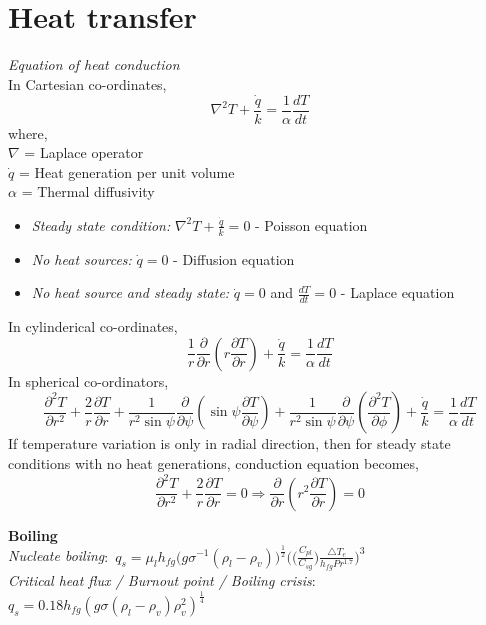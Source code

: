 \documentclass[12pt,a4paper]{article}
\begin{document}
\section*{Heat transfer}

\textit{Equation of heat conduction}\vspace{3mm}\\
In Cartesian co-ordinates,
$$\nabla ^{2}T+\frac{\dot{q}}{k}=\frac{1}{\alpha}\frac{dT}{dt}$$
where,\\
$\nabla$ = Laplace operator\\
$\dot{q}$ = Heat generation per unit volume\\
$\alpha$ = Thermal diffusivity\\
\begin{itemize}
    \item \textit{Steady state condition:} $\nabla ^{2}T+\frac{\dot{q}}{k}=0$ - Poisson equation
    \item \textit{No heat sources:} $\dot{q}=0$ - Diffusion equation
    \item \textit{No heat source and steady state:} $\dot{q}=0$ and $\frac{dT}{dt}=0$ - Laplace equation
\end{itemize}
In cylinderical co-ordinates,
$$ \frac{1}{r}\frac{\partial}{\partial r}\left( r \frac{\partial T}{\partial r} \right)+\frac{\dot{q}}{k}=\frac{1}{\alpha}\frac{dT}{dt}$$
In spherical co-ordinators,
$$\frac{\partial^2T}{\partial r^2}+\frac{2}{r} \frac{\partial T}{\partial r}+\frac{1}{r^2\sin\psi}\frac{\partial }{\partial \psi}\left( \sin\psi\frac{\partial T}{\partial \psi}\right)+\frac{1}{r^2\sin\psi}\frac{\partial }{\partial \psi}\left(\frac{\partial ^2T}{\partial \phi}\right)+\frac{\dot{q}}{k}=\frac{1}{\alpha}\frac{dT}{dt}$$
If temperature variation is only in radial direction, then for steady state conditions with no heat generations, conduction equation becomes, 
$$\frac{\partial^2T}{\partial r^2}+\frac{2}{r} \frac{\partial T}{\partial r}=0\Rightarrow \frac{\partial }{\partial r}\left(r^2\frac{\partial T}{\partial r}\right)=0$$

\noindent \textbf{Boiling}\\[0.5cm]
\textit{Nucleate boiling}$\colon$ $q_{s}=\mu_{l}h_{fg}\big(g \sigma ^{-1}(\rho_{l}-\rho_v)\big)^{\frac{1}{2}}\big(\big(\frac{C_{pl}}{C_{sg}}\big)\frac{\triangle T_e}{h_{fg}Pr^{1.7}}\big)^3$
\\ \textit{Critical heat flux / Burnout point / Boiling crisis}$\colon$
$q_{s}=0.18h_{fg}(g \sigma (\rho_{l}-\rho_v) \rho_{v}^{2})^{\frac{1}{4}}$
\end{document}
